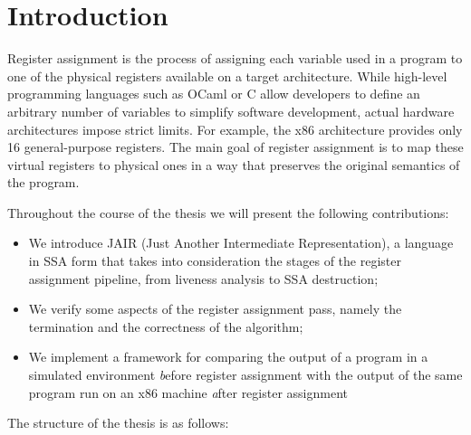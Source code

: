 
\chapter{Introduction}
\label{cha:intro}

Register assignment is the process of assigning each variable used in a program to one of the physical registers available on a target architecture. While high-level programming languages such as OCaml  or C allow developers to define an arbitrary number of variables to simplify software development, actual hardware architectures impose strict limits. For example, the x86 architecture provides only 16 general-purpose registers. The main goal of register assignment is to map these virtual registers to physical ones in a way that preserves the original semantics of the program.

Throughout the course of the thesis we will present the following contributions:
\begin{itemize}
    \item We introduce JAIR (Just Another Intermediate Representation), a language in SSA form that takes into consideration the stages of the register assignment pipeline, from liveness analysis to SSA destruction;

    \item We verify some aspects of the register assignment pass, namely the termination and the {\color{red} correctness} of the algorithm;

    \item We implement a framework for comparing the output of a program in a simulated environment \textit before register assignment with the output of the same program run on an x86 machine \textit after register assignment
\end{itemize}

The structure of the thesis is as follows:

